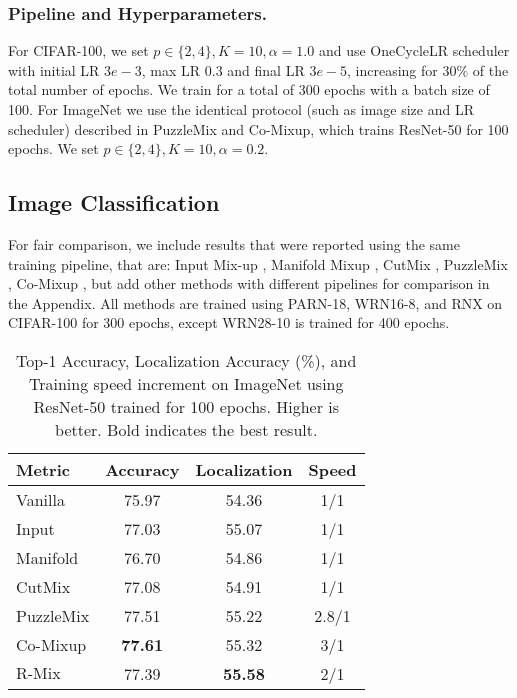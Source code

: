 \documentclass[letterpaper]{article} \usepackage[submission]{aaai23}  \usepackage{times}  \usepackage{helvet}  \usepackage{courier}  \usepackage[hyphens]{url}  \usepackage{graphicx} \urlstyle{rm} \def\UrlFont{\rm}  \usepackage{natbib}  \usepackage{caption} \frenchspacing  \setlength{\pdfpagewidth}{8.5in} \setlength{\pdfpageheight}{11in}
\newcommand{\mixup}{Input Mix-up}
\newcommand{\cutmix}{{CutMix}}
\newcommand{\puzzlemix}{{PuzzleMix}}
\newcommand{\comixup}{{Co-Mixup}}
\newcommand{\manifoldmixup}{{Manifold Mixup}}
\newcommand{\rrlmix}{{R-Mix}}
\newcommand{\cifar}{CIFAR-100}
\newcommand{\imagenet}{ImageNet}
\begin{document}
\subsubsection{Pipeline and Hyperparameters.}
For \cifar{}, we set $p \in \{2, 4\}, K=10, \alpha=1.0$ and use OneCycleLR scheduler with initial LR $3e-3$, max LR $0.3$ and final LR $3e-5$, increasing for $30\%$ of the total number of epochs. We train for a total of 300 epochs with a batch size of 100. For \imagenet{} we use the identical protocol (such as image size and LR scheduler) described in \puzzlemix{} and \comixup{}, which trains ResNet-50 for 100 epochs. We set $p \in \{2, 4\}, K=10, \alpha=0.2$.


\subsection{Image Classification}
For fair comparison, we include results that were reported using the same training pipeline, that are: \mixup{} \cite{zhang2018mixup}, \manifoldmixup{} \cite{verma2019manifold}, \cutmix{} \cite{yun2019cutmix}, \puzzlemix{} \cite{kim2020puzzlemix}, \comixup{} \cite{kim2021comixup}, but add other methods with different pipelines for comparison in the Appendix. All methods are trained using PARN-18, WRN16-8, and RNX on \cifar{} for 300 epochs, except WRN28-10 is trained for 400 epochs.


\begin{table}[t!]
  \centering
  \begin{tabular}{lccc}
  \hline
    Metric & Accuracy  & Localization & Speed\\ \hline
    Vanilla & 75.97  & 54.36 & 1/1\\ 
    Input & 77.03  & 55.07 & 1/1\\
    Manifold & 76.70  & 54.86 & 1/1 \\ 
    CutMix & 77.08  & 54.91 & 1/1 \\ 
    PuzzleMix & 77.51 & 55.22 & 2.8/1 \\ 
    Co-Mixup & \textbf{77.61}  & 55.32 & 3/1 \\ \hline
    $\text{\rrlmix{}}$ & 77.39 & \textbf{55.58} & 2/1 \\ \hline
  \end{tabular}
  \caption{Top-1 Accuracy, Localization Accuracy (\%), and Training speed increment on \imagenet{} using ResNet-50 trained for 100 epochs. Higher is better. Bold indicates the best result.}
  \label{tab:resultsImgNet}
\end{table}
\end{document}

